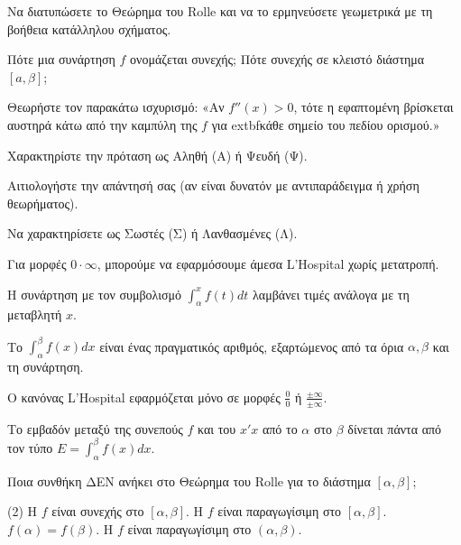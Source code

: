 \documentclass[11pt,a4paper]{article}
\newcommand{\kerkissans}[1]{{\fontfamily{maksf}\selectfont \textbf{#1}}}
\renewcommand{\textdexiakeraia}{}
\newcommand{\dint}{\displaystyle\int}
\newcommand\themanum{A}
\newcounter{thema}[section]
\renewcommand{\thethema}{\arabic{thema}}
\newcommand{\Thema}{\refstepcounter{thema}{\textbf{\textcolor{black}{\faPenSquare\ \  \large \kerkissans{\textbf{\thethemaο\hspace{2mm}Διαγώνισμα - Θέμα \themanum}}}}}\hspace{0mm}}{}
\newenvironment{thema}[1]
{\begin{tcolorbox}[title=\Thema\kerkissans{\textbf{\large{  #1}}},breakable,
enhanced standard,titlerule=0pt,toprule=0pt, rightrule=0pt, bottomrule=0pt,
colback=white,left=0mm,top=1mm,bottom=0mm,
boxrule=0pt,
colframe=white,leftrule=0mm,sharp corners,coltitle=black]
\renewcommand{\themanum}{#1}}
{\end{tcolorbox}}
\begin{document}
\begin{thema}{A}
\begin{erwthma}
    \item Να διατυπώσετε το Θεώρημα του Rolle και να το ερμηνεύσετε γεωμετρικά με τη βοήθεια κατάλληλου σχήματος.
    \item Πότε μια συνάρτηση $f$ ονομάζεται συνεχής; Πότε συνεχής σε κλειστό διάστημα $[a, \beta]$;
    \item Θεωρήστε τον παρακάτω ισχυρισμό:
    «Αν $f''(x)>0$, τότε η εφαπτομένη βρίσκεται αυστηρά κάτω από την καμπύλη της $f$ για 	extbf{κάθε} σημείο του πεδίου ορισμού.»
    \begin{alist}
    \item Χαρακτηρίστε την πρόταση ως Αληθή (Α) ή Ψευδή (Ψ).
    \item Αιτιολογήστε την απάντησή σας (αν είναι δυνατόν με αντιπαράδειγμα ή χρήση θεωρήματος).
    \end{alist}
    \item Να χαρακτηρίσετε ως Σωστές (Σ) ή Λανθασμένες (Λ).
    \begin{alist}
        \item Για μορφές $0 \cdot \infty$, μπορούμε να εφαρμόσουμε άμεσα L'Hospital χωρίς μετατροπή.
        \item Η συνάρτηση με τον συμβολισμό $\dint_\alpha^x f(t)dt$ λαμβάνει τιμές ανάλογα με τη μεταβλητή $x$.
        \item Το $\dint_\alpha^\beta f(x) dx$ είναι ένας πραγματικός αριθμός, εξαρτώμενος από τα όρια $\alpha, \beta$ και τη συνάρτηση.
        \item Ο κανόνας L'Hospital εφαρμόζεται μόνο σε μορφές $\frac{0}{0}$ ή $\frac{\pm \infty}{\pm \infty}$.
        \item Το εμβαδόν μεταξύ της συνεπούς $f$ και του $x'x$ από το $\alpha$ στο $\beta$ δίνεται πάντα από τον τύπο $E = \dint_\alpha^\beta f(x) dx$.
    \end{alist}
    \item Ποια συνθήκη ΔΕΝ ανήκει στο Θεώρημα του Rolle για το διάστημα $[\alpha, \beta]$;
    \begin{tasks}[label=\let\textdexiakeraia\relax\alph*.](2)
        \task H $f$ είναι συνεχής στο $[\alpha, \beta]$.
        \task H $f$ είναι παραγωγίσιμη στο $[\alpha, \beta]$.
        \task $f(\alpha) = f(\beta)$.
        \task H $f$ είναι παραγωγίσιμη στο $(\alpha, \beta)$.
    \end{tasks}
\end{erwthma}
\end{thema}
\vspace{1cm}
\end{document}
